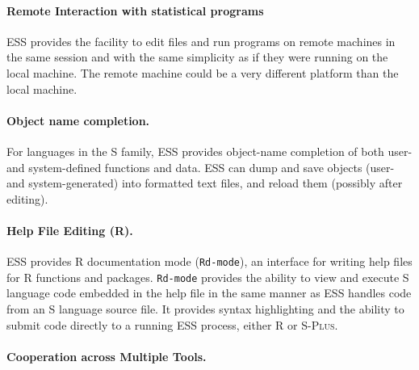 \documentclass{article}
\newcommand*{\Splus}{\textsc{S-Plus}}
\newcommand{\stexttt}[1]{{\small\texttt{#1}}}
\begin{document}
\paragraph{Remote Interaction with statistical programs}%
ESS provides the facility to edit files and run programs on remote
machines in the same session and with the same simplicity as if they
were running on the local machine.  The remote machine could be a very
different platform than the local machine.

\paragraph{Object name completion.}
For languages in the S family, ESS provides object-name completion of
both user- and system-defined functions and data.  ESS can dump and
save objects (user- and system-generated) into formatted text files,
and reload them (possibly after editing).

\paragraph{Help File Editing (R).}
ESS provides R documentation mode (\stexttt{Rd-mode}), an interface
for writing help files for R functions and packages.
\stexttt{Rd-mode} provides the ability to view and execute S language
code embedded in the help file in the same manner as ESS handles code
from an S language source file.  It provides syntax highlighting and
the ability to submit code directly to a running ESS process, either R
or \Splus.



\paragraph{Cooperation across Multiple Tools.}
\label{sec:multiple-tools}
\end{document}
